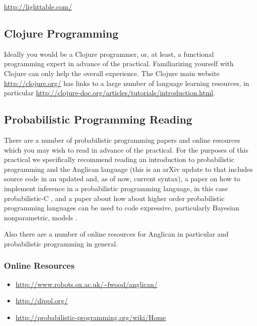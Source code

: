 \documentclass{article}
\begin{document}
\url{http://lighttable.com/}

\subsection{Clojure Programming}

Ideally you would be a Clojure programmer, or, at least, a functional 
programming expert in advance of the practical.  Familiarizing yourself
with Clojure can only help the overall experience.  The Clojure main website
\url{http://clojure.org/} has links to a large number of language 
learning resources, in particular \url{http://clojure-doc.org/articles/tutorials/introduction.html}.

\subsection{Probabilistic Programming Reading}

There are a number of probabilistic programming papers and online resources which you 
may wish to read in advance of the practical.  For the purposes of this practical we
specifically recommend reading an introduction to probabilistic programming and the Anglican language \cite{Wood-AISTATS-2014-arXiv-syntax-update-2015} (this is an arXiv update to \cite{Wood-AISTATS-2014} that includes source code in an updated and, as of now, current syntax), a paper on how to implement inference in a probabilistic programming language, in this case probabilistic-C \cite{Paige-ICML-2014}, and a paper about how about higher order probabilistic programming languages can be used to code expressive, particularly Bayesian nonparametric, models \cite{goodman2008church}.

Also there are a number of online resources for Anglican in particular and
probabilistic programming in general.  

\subsubsection{Online Resources}
\begin{itemize}
\item \url{http://www.robots.ox.ac.uk/~fwood/anglican/}
\item \url{http://dippl.org/}
\item \url{http://probabilistic-programming.org/wiki/Home}
\end{itemize}

  

\end{document}
